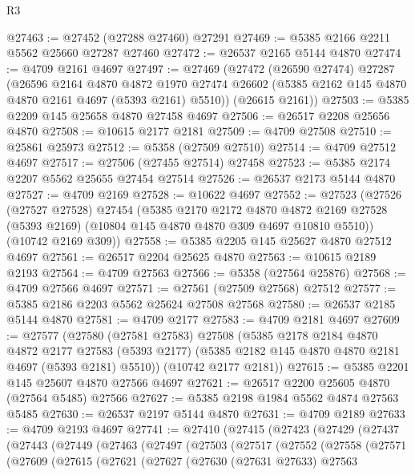 \begin{lexlean}{R3}
\begin{coremodule}
@27463 := @27452 (@27288 @27460) @27291
@27469 := @5385 @2166 @2211 @5562 @25660 @27287 @27460
@27472 := @26537 @2165 @5144 @4870
@27474 := @4709 @2161 @4697
@27497 := @27469
    (@27472
      (@26590 @27474)
      @27287
      (@26596
        @2164
        @4870
        @4872
        @1970
        @27474
        @26602
        (@5385 @2162 @145 @4870 @4870 @2161 @4697 (@5393 @2161) @5510))
      (@26615 @2161))
@27503 := @5385 @2209 @145 @25658 @4870 @27458 @4697
@27506 := @26517 @2208 @25656 @4870
@27508 := @10615 @2177 @2181
@27509 := @4709 @27508
@27510 := @25861 @25973
@27512 := @5358 (@27509 @27510)
@27514 := @4709 @27512 @4697
@27517 := @27506 (@27455 @27514) @27458
@27523 := @5385 @2174 @2207 @5562 @25655 @27454 @27514
@27526 := @26537 @2173 @5144 @4870
@27527 := @4709 @2169
@27528 := @10622 @4697
@27552 := @27523
    (@27526
      (@27527 @27528)
      @27454
      (@5385
        @2170
        @2172
        @4870
        @4872
        @2169
        @27528
        (@5393 @2169)
        (@10804 @145 @4870 @4870 @309 @4697 @10810 @5510))
      (@10742 @2169 @309))
@27558 := @5385 @2205 @145 @25627 @4870 @27512 @4697
@27561 := @26517 @2204 @25625 @4870
@27563 := @10615 @2189 @2193
@27564 := @4709 @27563
@27566 := @5358 (@27564 @25876)
@27568 := @4709 @27566 @4697
@27571 := @27561 (@27509 @27568) @27512
@27577 := @5385 @2186 @2203 @5562 @25624 @27508 @27568
@27580 := @26537 @2185 @5144 @4870
@27581 := @4709 @2177
@27583 := @4709 @2181 @4697
@27609 := @27577
    (@27580
      (@27581 @27583)
      @27508
      (@5385
        @2178
        @2184
        @4870
        @4872
        @2177
        @27583
        (@5393 @2177)
        (@5385 @2182 @145 @4870 @4870 @2181 @4697 (@5393 @2181) @5510))
      (@10742 @2177 @2181))
@27615 := @5385 @2201 @145 @25607 @4870 @27566 @4697
@27621 := @26517 @2200 @25605 @4870 (@27564 @5485) @27566
@27627 := @5385 @2198 @1984 @5562 @4874 @27563 @5485
@27630 := @26537 @2197 @5144 @4870
@27631 := @4709 @2189
@27633 := @4709 @2193 @4697
@27741 := @27410
    (@27415
      (@27423
        (@27429
          (@27437
            (@27443
              (@27449
                (@27463
                  (@27497
                    (@27503
                      (@27517
                        (@27552
                          (@27558
                            (@27571
                              (@27609
                                (@27615
                                  (@27621
                                    (@27627
                                      (@27630
                                        (@27631 @27633)
                                        @27563

\end{coremodule}
\end{lexlean}
